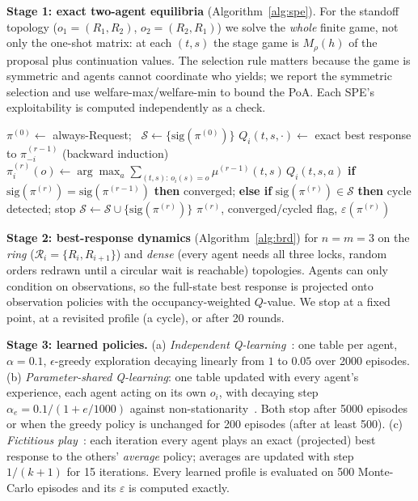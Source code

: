 \documentclass[10pt]{article}
\newcommand{\Req}{\textsf{Request}}
\begin{document}
\textbf{Stage 1: exact two-agent equilibria} (Algorithm~\ref{alg:spe}). For the standoff topology
($o_1=(R_1,R_2)$, $o_2=(R_2,R_1)$) we solve the \emph{whole} finite game, not only the one-shot matrix: at each $(t,s)$ the
stage game is $M_\rho(h)$ of the proposal plus continuation values. The selection rule matters because the game is
symmetric and agents cannot coordinate who yields; we report the symmetric selection and use welfare-max/welfare-min to
bound the PoA. Each SPE's exploitability is computed independently as a check.

\begin{algorithm}[t]
\caption{Stage 2: best-response dynamics with observation projection}\label{alg:brd}
\small
\begin{algorithmic}[1]
\State $\pi^{(0)}\gets$ always-\Req; \ $\mathcal S\gets\{\mathrm{sig}(\pi^{(0)})\}$
    \State $Q_i(t,s,\cdot)\gets$ exact best response to $\pi^{(r-1)}_{-i}$ (backward induction)
    \State $\pi^{(r)}_i(o)\gets\arg\max_a\sum_{(t,s):\,o_i(s)=o}\mu^{(r-1)}(t,s)\,Q_i(t,s,a)$ 
  \EndFor
  \State \textbf{if} $\mathrm{sig}(\pi^{(r)})=\mathrm{sig}(\pi^{(r-1)})$ \textbf{then} converged; \textbf{else if} $\mathrm{sig}(\pi^{(r)})\in\mathcal S$ \textbf{then} cycle detected; stop
  \State $\mathcal S\gets\mathcal S\cup\{\mathrm{sig}(\pi^{(r)})\}$
\EndFor
\State \Return $\pi^{(r)}$, converged/cycled flag, $\varepsilon(\pi^{(r)})$
\end{algorithmic}
\end{algorithm}

\textbf{Stage 2: best-response dynamics} (Algorithm~\ref{alg:brd}) for $n=m=3$ on the \emph{ring}
($\mathcal R_i=\{R_i,R_{i+1}\}$) and \emph{dense} (every agent needs all three locks, random orders redrawn until a circular
wait is reachable) topologies. Agents can only condition on observations, so the full-state best response is projected
onto observation policies with the occupancy-weighted $Q$-value. We stop at a fixed point, at a revisited profile (a cycle),
or after 20 rounds.

\textbf{Stage 3: learned policies.} (a) \emph{Independent Q-learning}~\cite{watkins}: one table per agent, $\alpha=0.1$,
$\epsilon$-greedy exploration decaying linearly from $1$ to $0.05$ over 2000 episodes. (b) \emph{Parameter-shared
Q-learning}: one table updated with every agent's experience, each agent acting on its own $o_i$, with decaying step
$\alpha_e=0.1/(1+e/1000)$ against non-stationarity~\cite{tan,claus}. Both stop after 5000 episodes or when the greedy
policy is unchanged for 200 episodes (after at least 500). (c) \emph{Fictitious play}~\cite{brown}: each iteration every
agent plays an exact (projected) best response to the others' \emph{average} policy; averages are updated with step
$1/(k{+}1)$ for 15 iterations. Every learned profile is evaluated on 500 Monte-Carlo episodes and its $\varepsilon$ is
computed exactly.
\end{document}
